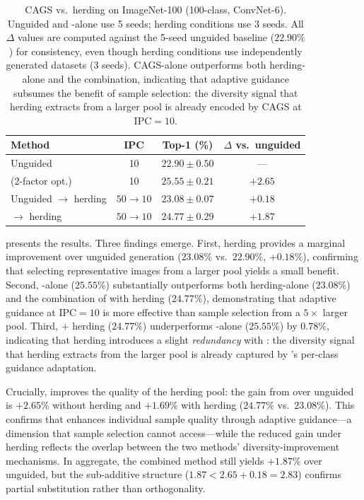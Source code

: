 \begin{table}[t]
\centering
\caption{CAGS vs.\ herding on ImageNet-100 (100-class, ConvNet-6). Unguided and \cags{}-alone use 5 seeds; herding conditions use 3 seeds. All $\Delta$ values are computed against the 5-seed unguided baseline ($22.90\%$) for consistency, even though herding conditions use independently generated datasets (3 seeds). CAGS-alone outperforms both herding-alone and the combination, indicating that adaptive guidance subsumes the benefit of sample selection: the diversity signal that herding extracts from a larger pool is already encoded by CAGS at IPC$=10$.}
\label{tab:orthogonality}
\begin{tabular}{lccc}
\toprule
\textbf{Method} & \textbf{IPC} & \textbf{Top-1 (\%)} & \textbf{$\Delta$ vs.\ unguided} \\
\midrule
Unguided & 10 & $22.90 \pm 0.50$ & --- \\
\cags{} (2-factor opt.) & 10 & $25.55 \pm 0.21$ & $+2.65$ \\
\midrule
Unguided $\to$ herding & $50 \to 10$ & $23.08 \pm 0.07$ & $+0.18$ \\
\cags{} $\to$ herding & $50 \to 10$ & $24.77 \pm 0.29$ & $+1.87$ \\
\bottomrule
\end{tabular}
\end{table}

 presents the results. Three findings emerge. First, herding provides a marginal improvement over unguided generation ($23.08\%$ vs.\ $22.90\%$, $+0.18\%$), confirming that selecting representative images from a larger pool yields a small benefit. Second, \cags{}-alone ($25.55\%$) substantially outperforms both herding-alone ($23.08\%$) and the combination of \cags{} with herding ($24.77\%$), demonstrating that adaptive guidance at IPC$=10$ is more effective than sample selection from a $5\times$ larger pool. Third, \cags{} $+$ herding ($24.77\%$) underperforms \cags{}-alone ($25.55\%$) by $0.78\%$, indicating that herding introduces a slight \emph{redundancy} with \cags{}: the diversity signal that herding extracts from the larger pool is already captured by \cags{}'s per-class guidance adaptation.

Crucially, \cags{} improves the quality of the herding pool: the gain from \cags{} over unguided is $+2.65\%$ without herding and $+1.69\%$ with herding ($24.77\%$ vs.\ $23.08\%$). This confirms that \cags{} enhances individual sample quality through adaptive guidance---a dimension that sample selection cannot access---while the reduced gain under herding reflects the overlap between the two methods' diversity-improvement mechanisms. In aggregate, the combined method still yields $+1.87\%$ over unguided, but the sub-additive structure ($1.87 < 2.65 + 0.18 = 2.83$) confirms partial substitution rather than orthogonality.

